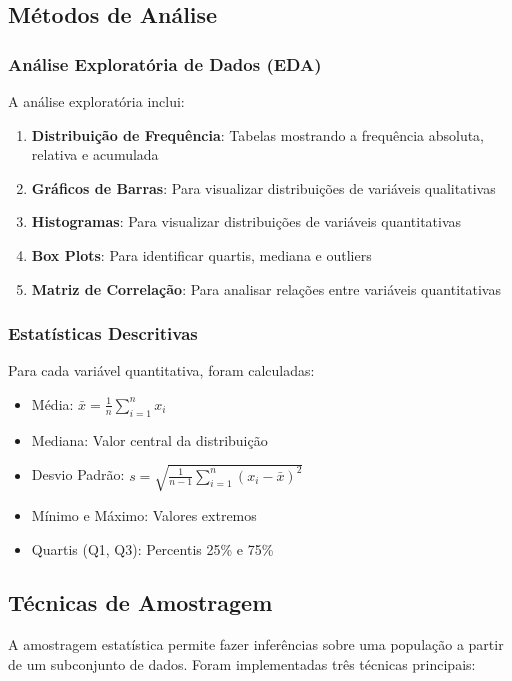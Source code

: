 \documentclass[12pt,a4paper]{article}
\begin{document}
\subsection{Métodos de Análise}

\subsubsection{Análise Exploratória de Dados (EDA)}

A análise exploratória inclui:

\begin{enumerate}
    \item \textbf{Distribuição de Frequência}: Tabelas mostrando a frequência absoluta, relativa e acumulada
    \item \textbf{Gráficos de Barras}: Para visualizar distribuições de variáveis qualitativas
    \item \textbf{Histogramas}: Para visualizar distribuições de variáveis quantitativas
    \item \textbf{Box Plots}: Para identificar quartis, mediana e outliers
    \item \textbf{Matriz de Correlação}: Para analisar relações entre variáveis quantitativas
\end{enumerate}

\subsubsection{Estatísticas Descritivas}

Para cada variável quantitativa, foram calculadas:

\begin{itemize}
    \item Média: $\bar{x} = \frac{1}{n}\sum_{i=1}^{n} x_i$
    \item Mediana: Valor central da distribuição
    \item Desvio Padrão: $s = \sqrt{\frac{1}{n-1}\sum_{i=1}^{n}(x_i - \bar{x})^2}$
    \item Mínimo e Máximo: Valores extremos
    \item Quartis (Q1, Q3): Percentis 25\% e 75\%
\end{itemize}

\subsection{Técnicas de Amostragem}

A amostragem estatística permite fazer inferências sobre uma população a partir de um subconjunto de dados. Foram implementadas três técnicas principais:
\end{document}
